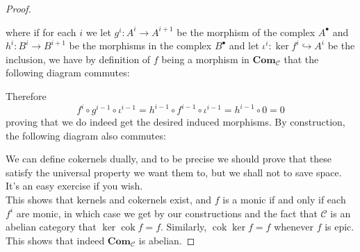 \documentclass{article}
\newcommand{\fC}{\mathscr{C}}
\newcommand{\Com}{\mathbf{Com}} %
\DeclareMathOperator{\cok}{\mathrm{cok}}
\begin{document}
\begin{proof}
\begin{center}
    \end{center}
    where if for each $i$ we let $g^i:A^i\to A^{i+1}$ be the morphism of the complex $A^\bullet$ and $h^i:B^i\to B^{i+1}$ be the morphisms in the complex $B^\bullet$ and let $\iota^i:\ker f^i\hookrightarrow A^i$ be the inclusion, we have by definition of $f$ being a morphism in $\Com_\fC$ that the following diagram commutes:
    \begin{center}
    \end{center}
    Therefore
    \[
    f^i\circ g^{i-1}\circ \iota^{i-1}=h^{i-1}\circ f^{i-1} \circ \iota^{i-1}= h^{i-1}\circ 0=0
    \]
    proving that we do indeed get the desired induced morphisms. By construction, the following diagram also commutes:
    \begin{center}
    \end{center}
    We can define cokernels dually, and to be precise we should prove that these satisfy the universal property we want them to, but we shall not to save space. It's an easy exercise if you wish.\\
    This shows that kernels and cokernels exist, and $f$ is a monic if and only if each $f^i$ are monic, in which case we get by our constructions and the fact that $\fC$ is an abelian category that $\ker \cok f=f$. Similarly, $\cok \ker f=f$ whenever $f$ is epic. This shows that indeed $\Com_\fC$ is abelian.
\end{proof}
\end{document}
